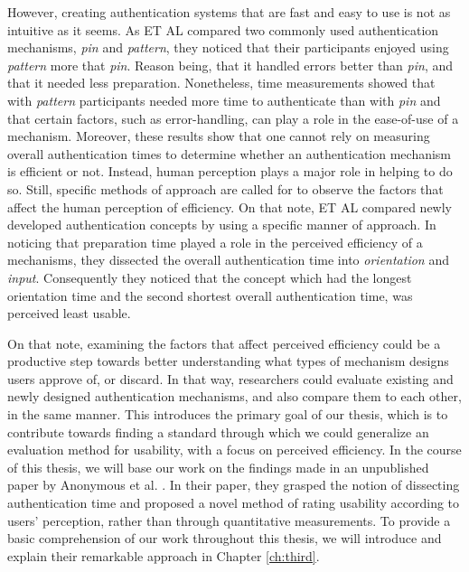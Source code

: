 However, creating authentication systems that are fast and easy to use is not as intuitive as it seems. As ET AL compared two commonly used authentication mechanisms, \textit{pin} and \textit{pattern}, they noticed that their participants enjoyed using \textit{pattern} more that \textit{pin}. Reason being, that it handled errors better than \textit{pin}, and that it needed less preparation. Nonetheless, time measurements showed that with \textit{pattern} participants needed more time to authenticate than with \textit{pin} and that certain factors, such as error-handling, can play a role in the ease-of-use of a mechanism. Moreover, these results show that one cannot rely on measuring overall authentication times to determine whether an authentication mechanism is efficient or not. Instead, human perception plays a major role in helping to do so. Still, specific methods of approach are called for to observe the factors that affect the human perception of efficiency. On that note, ET AL compared newly developed authentication concepts by using a specific manner of approach. In noticing that preparation time played a role in the perceived efficiency of a mechanisms, they dissected the overall authentication time into \textit{orientation} and \textit{input}. Consequently they noticed that the concept which had the longest orientation time and the second shortest overall authentication time, was perceived least usable. 





On that note, examining the factors that affect perceived efficiency could be a productive step towards better understanding what types of mechanism designs users approve of, or discard. In that way, researchers could evaluate existing and newly designed authentication mechanisms, and also compare them to each other, in the same manner. This introduces the primary goal of our thesis, which is to contribute towards finding a standard through which we could generalize an evaluation method for usability, with a focus on perceived efficiency. In the course of this thesis, we will base our work on the findings made in an unpublished paper by Anonymous et al. \cite{anonymous}. In their paper, they grasped the notion of dissecting authentication time and proposed a novel method of rating usability according to users' perception, rather than through quantitative measurements. To provide a basic comprehension of our work throughout this thesis, we will introduce and explain their remarkable approach in Chapter \ref{ch:third}.\\



